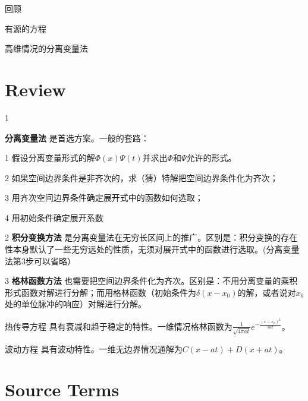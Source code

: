 \documentclass[CJK]{beamer}
\date{}
\begin{document}

\begin{frame}
\bch
\bitem
\item{回顾}
\item{有源的方程}    
\item{高维情况的分离变量法}
\eitem
\ech
\end{frame}


\section{Review}

\begin{frame}
\bch
\bitem
\item[1]{{\blue \bf 分离变量法} 是首选方案。一般的套路：
  \bitem
      \item[1]{ 假设分离变量形式的解$\Phi(x)\Psi(t)$并求出$\Phi$和$\Psi$允许的形式。}
      \item[2]{如果空间边界条件是非齐次的，求（猜）特解把空间边界条件化为齐次； }
      \item[3]{用齐次空间边界条件确定展开式中的函数如何选取；}
      \item[4]{用初始条件确定展开系数}
        \eitem}
\item[2]{{\blue \bf 积分变换方法} 是分离变量法在无穷长区间上的推广。区别是：积分变换的存在性本身默认了一些无穷远处的性质，无须对展开式中的函数进行选取。(分离变量法第3步可以省略）}
\item[3]{{\blue \bf 格林函数方法} 也需要把空间边界条件化为齐次。区别是：不用分离变量的乘积形式函数对解进行分解；而用格林函数（初始条件为$\delta(x-x_0)$的解，或者说对$x_0$处的单位脉冲的响应）对解进行分解。}
\eitem
\ech
\end{frame}


\begin{frame}
\bch
热传导方程
具有衰减和趋于稳定的特性。一维情况格林函数为$\frac{1}{\sqrt{4\pi at}}e^{-\frac{(x-x_0)^2}{4at}}$。

\skiplines

波动方程
具有波动特性。一维无边界情况通解为$C(x-at)+D(x+at)$。
\ech
\end{frame}

\section{Source Terms}
\end{document}
